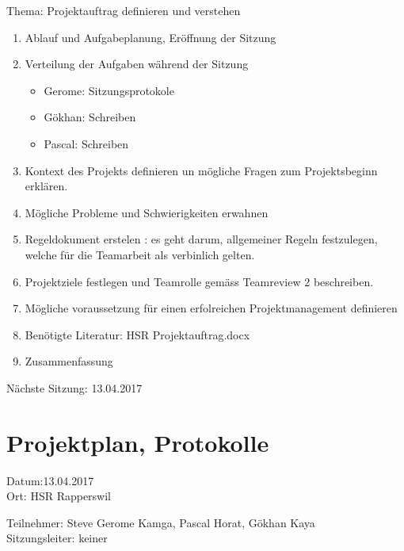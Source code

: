 Thema: Projektauftrag definieren und verstehen
\begin{enumerate}

\item Ablauf und Aufgabeplanung, Eröffnung der Sitzung 

\item  Verteilung der Aufgaben während der Sitzung
\begin{itemize}
\item Gerome: Sitzungsprotokole
\item Gökhan: Schreiben
\item Pascal: Schreiben 
\end{itemize}

\item Kontext des Projekts definieren un mögliche Fragen zum Projektsbeginn erklären.

\item Mögliche Probleme und Schwierigkeiten erwahnen

\item Regeldokument erstelen : es geht darum, allgemeiner Regeln festzulegen, welche für die Teamarbeit als verbinlich gelten.

\item Projektziele festlegen und Teamrolle gemäss Teamreview 2 beschreiben.

\item Mögliche voraussetzung für einen erfolreichen Projektmanagement definieren

\item Benötigte Literatur: HSR Projektauftrag.docx   

\item Zusammenfassung

\end{enumerate}

Nächste Sitzung: 13.04.2017




\newpage

\section*{Projektplan, Protokolle}

Datum:13.04.2017\\
Ort: HSR Rapperswil

Teilnehmer: Steve Gerome Kamga, Pascal Horat, Gökhan Kaya\\
Sitzungsleiter: keiner

